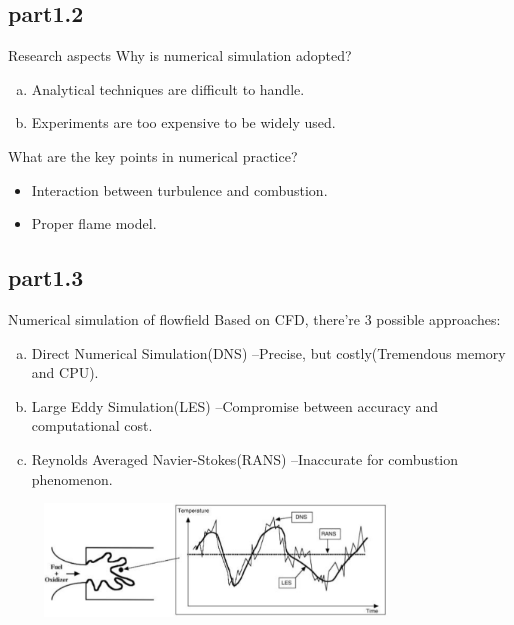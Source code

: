 	\subsection{part1.2}
		\begin{xframe}{Research aspects}
			Why is numerical simulation adopted?
			\begin{enumerate}[(a)]
				\item 
					Analytical techniques are difficult to handle.
				\item
					Experiments are too expensive to be widely used.
			\end{enumerate}
			What are the key points in numerical practice?
			\begin{itemize}
				\item Interaction between turbulence and combustion.
				\item Proper flame model.
			\end{itemize}
		\end{xframe}
	\subsection{part1.3}
		\begin{xframe}{Numerical simulation of flowfield}
			Based on CFD, there're 3 possible approaches:
			\begin{enumerate}[(a)]
				\item{Direct Numerical Simulation(DNS)}\newline
					--Precise, but costly(Tremendous memory and CPU). %
				\item Large Eddy Simulation(LES)\newline
					--Compromise between accuracy and computational cost. %
				\item Reynolds Averaged Navier-Stokes(RANS)\newline
					--Inaccurate for combustion phenomenon. %
			\end{enumerate}
			\includegraphics[width=11cm, height=3cm]{../pic/comparision.png}
		\end{xframe}
